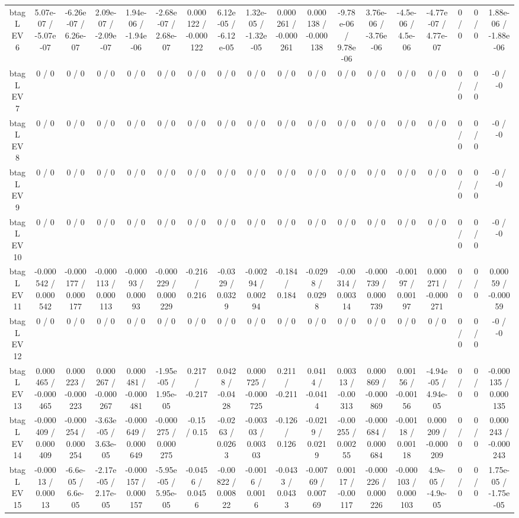 \documentclass[10pt]{article}
\begin{document}
\begin{table}[htbp]
\begin{center}
\begin{tabular}{|c|c|c|c|c|c|c|c|c|c|c|c|c|c|c|c|c|c|}
  btag L EV 6 & 5.07e-07 / -5.07e-07 & -6.26e-07 / 6.26e-07 & 2.09e-07 / -2.09e-07 & 1.94e-06 / -1.94e-06 & -2.68e-07 / 2.68e-07 & 0.000122 / -0.000122 & 6.12e-05 / -6.12e-05 & 1.32e-05 / -1.32e-05 & 0.000261 / -0.000261 & 0.000138 / -0.000138 & -9.78e-06 / 9.78e-06 & 3.76e-06 / -3.76e-06 & -4.5e-06 / 4.5e-06 & -4.77e-07 / 4.77e-07 & 0 / 0 & 0 / 0 & 1.88e-06 / -1.88e-06 \\ 
  btag L EV 7 & 0 / 0 & 0 / 0 & 0 / 0 & 0 / 0 & 0 / 0 & 0 / 0 & 0 / 0 & 0 / 0 & 0 / 0 & 0 / 0 & 0 / 0 & 0 / 0 & 0 / 0 & 0 / 0 & 0 / 0 & 0 / 0 & -0 / -0 \\ 
  btag L EV 8 & 0 / 0 & 0 / 0 & 0 / 0 & 0 / 0 & 0 / 0 & 0 / 0 & 0 / 0 & 0 / 0 & 0 / 0 & 0 / 0 & 0 / 0 & 0 / 0 & 0 / 0 & 0 / 0 & 0 / 0 & 0 / 0 & -0 / -0 \\ 
  btag L EV 9 & 0 / 0 & 0 / 0 & 0 / 0 & 0 / 0 & 0 / 0 & 0 / 0 & 0 / 0 & 0 / 0 & 0 / 0 & 0 / 0 & 0 / 0 & 0 / 0 & 0 / 0 & 0 / 0 & 0 / 0 & 0 / 0 & -0 / -0 \\ 
  btag L EV 10 & 0 / 0 & 0 / 0 & 0 / 0 & 0 / 0 & 0 / 0 & 0 / 0 & 0 / 0 & 0 / 0 & 0 / 0 & 0 / 0 & 0 / 0 & 0 / 0 & 0 / 0 & 0 / 0 & 0 / 0 & 0 / 0 & -0 / -0 \\ 
  btag L EV 11 & -0.000542 / 0.000542 & -0.000177 / 0.000177 & -0.000113 / 0.000113 & -0.00093 / 0.00093 & -0.000229 / 0.000229 & -0.216 / 0.216 & -0.0329 / 0.0329 & -0.00294 / 0.00294 & -0.184 / 0.184 & -0.0298 / 0.0298 & -0.00314 / 0.00314 & -0.000739 / 0.000739 & -0.00197 / 0.00197 & 0.000271 / -0.000271 & 0 / 0 & 0 / 0 & 0.00059 / -0.00059 \\ 
  btag L EV 12 & 0 / 0 & 0 / 0 & 0 / 0 & 0 / 0 & 0 / 0 & 0 / 0 & 0 / 0 & 0 / 0 & 0 / 0 & 0 / 0 & 0 / 0 & 0 / 0 & 0 / 0 & 0 / 0 & 0 / 0 & 0 / 0 & -0 / -0 \\ 
  btag L EV 13 & 0.000465 / -0.000465 & 0.000223 / -0.000223 & 0.000267 / -0.000267 & 0.000481 / -0.000481 & -1.95e-05 / 1.95e-05 & 0.217 / -0.217 & 0.0428 / -0.0428 & 0.000725 / -0.000725 & 0.211 / -0.211 & 0.0414 / -0.0414 & 0.00313 / -0.00313 & 0.000869 / -0.000869 & 0.00156 / -0.00156 & -4.94e-05 / 4.94e-05 & 0 / 0 & 0 / 0 & -0.000135 / 0.000135 \\ 
  btag L EV 14 & -0.000409 / 0.000409 & -0.000254 / 0.000254 & -3.63e-05 / 3.63e-05 & -0.000649 / 0.000649 & -0.000275 / 0.000275 & -0.15 / 0.15 & -0.0263 / 0.0263 & -0.00303 / 0.00303 & -0.126 / 0.126 & -0.0219 / 0.0219 & -0.00255 / 0.00255 & -0.000684 / 0.000684 & -0.00118 / 0.00118 & 0.000209 / -0.000209 & 0 / 0 & 0 / 0 & 0.000243 / -0.000243 \\ 
  btag L EV 15 & -0.00013 / 0.00013 & -6.6e-05 / 6.6e-05 & -2.17e-05 / 2.17e-05 & -0.000157 / 0.000157 & -5.95e-05 / 5.95e-05 & -0.0456 / 0.0456 & -0.00822 / 0.00822 & -0.0016 / 0.0016 & -0.0433 / 0.0433 & -0.00769 / 0.00769 & 0.00117 / -0.00117 & -0.000226 / 0.000226 & -0.000103 / 0.000103 & 4.9e-05 / -4.9e-05 & 0 / 0 & 0 / 0 & 1.75e-05 / -1.75e-05 \\ 

\end{tabular}
\end{center}
\end{table}
\end{document}
